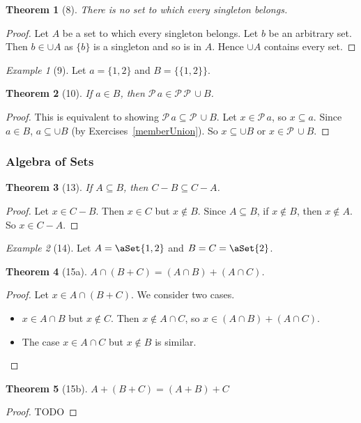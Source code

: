 \documentclass[12pt]{article}
\theoremstyle{plain}
\newtheorem*{exthm}{Theorem}
\theoremstyle{remark}
\newtheorem*{eg}{Example}
\theoremstyle{definition}
\theoremstyle{remark}
\newcommand{\powerset}{\mathscr{P}\,}
\DeclarePairedDelimiter\aSet\{\}
\begin{document}
\begin{exthm}[8]
  There is no set to which every singleton belongs.
\end{exthm}
\begin{proof}
  Let $A$ be a set to which every singleton belongs. Let $b$ be an arbitrary set. Then $b \in \cup A$ as $\{b\}$ is a singleton and so is in $A$. Hence $\cup A$ contains every set.
\end{proof}

\begin{eg}[9]
  Let $a = \{1,2\}$ and $B = \{\{1,2\}\}$.
\end{eg}

\begin{exthm}[10]
  If $a \in B$, then $\powerset a \in \powerset \powerset \cup B$.
\end{exthm}
\begin{proof}
  This is equivalent to showing $\powerset a \subseteq \powerset \cup B$. Let $x \in \powerset a$, so $x \subseteq a$. Since $a \in B$, $a \subseteq \cup B$ (by Exercises~\ref{memberUnion}). So $x \subseteq \cup B$ or $x \in \powerset \cup B$.
\end{proof}

\subsubsection{Algebra of Sets}

\begin{exthm}[13]
  If $A \subseteq B$, then $C - B \subseteq C - A$.
\end{exthm}
\begin{proof}
  Let $x \in C - B$. Then $x \in C$ but $x \not\in B$. Since $A \subseteq B$, if $x \not\in B$, then $x \not\in A$. So $x \in C - A$.
\end{proof}

\begin{eg}[14]
  Let $A = \aSet{1,2}$ and $B = C = \aSet{2}$.
\end{eg}

\begin{exthm}[15a]
  $A \cap (B + C) = (A \cap B) + (A \cap C)$.
\end{exthm}
\begin{proof}
  Let $x \in A \cap (B + C)$. We consider two cases.
  \begin{itemize}
    \item $x \in A \cap B$ but $x \not\in C$. Then $x \not\in A \cap C$, so $x \in (A \cap B) + (A \cap C)$.
    \item The case $x \in A \cap C$ but $x \not\in B$ is similar.
  \end{itemize}
\end{proof}
\begin{exthm}[15b]
  $A + (B + C) = (A + B) + C$
\end{exthm}
\begin{proof}
  TODO
\end{proof}
\end{document}
